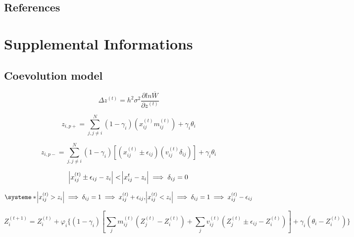 \documentclass[a4paper, 12pt]{article}
\begin{document}
\subsection*{References}
\begin{singlespace}
\printbibliography[heading = none]
\end{singlespace}
\newpage

\newrefsection
\renewcommand{\theequation}{S.\arabic{equation}}
\setcounter{equation}{0}
\section*{Supplemental Informations}

\subsection*{Coevolution model}
\cite{guimaraes_jr_indirect_2017}

\begin{equation}  \label{supeq:1}
  \Delta z^{(t)} = h^{2} \sigma^{2} \frac{\partial{ln \overline{W}}}{\partial z^{(t)}}
\end{equation}

\begin{equation}  \label{supeq:2}
  z_{i, p +} = \sum_{j, j \neq i}^{N} (1 - \gamma_{i})(x^{(t)}_{ij} m^{(t)}_{ij}) + \gamma_{i} \theta_{i}
\end{equation}

\begin{equation} \label{supeq:3}
  z_{i, p -} = \sum_{j, j \neq i}^{N}(1 - \gamma_{i})[(x^{(t)}_{ij} \pm \epsilon_{ij})(v^{(t)}_{ij}\delta_{ij})] + \gamma_{i} \theta_{i}
\end{equation}

\begin{equation} \label{supeq:4}
\abs{x^{(t)}_{ij} \pm \epsilon_{ij} - z_{i}} < \abs{x^{t}_{ij} - z_{i}} \implies \delta_{ij} = 0
\end{equation}

\begin{equation} \label{supeq:5}
    \systeme*{\abs{x^{(t)}_{ij} > z_{i}} \implies \delta_{ij} = 1 \implies x^{(t)}_{ij} + \epsilon_{ij},\abs{x^{(t)}_{ij} < z_{i}} \implies \delta_{ij} = 1 \implies x^{(t)}_{ij} - \epsilon_{ij}}
\end{equation}

\begin{equation} \tag{5}
  Z^{(t+1)}_{i} = Z^{(t)}_{i} + \varphi_{i}\{(1 - \gamma_{i})[\sum_{j} m^{(t)}_{ij}(Z^{(t)}_{j} - Z^{(t)}_{i}) + \sum_{j}v^{(t)}_{ij}(Z^{(t)}_{j} \pm \epsilon_{ij} - Z^{(t)}_{i})] + \gamma_{i}(\theta_{i} - Z^{(t)}_{i})\}
\end{equation}
\end{document}
